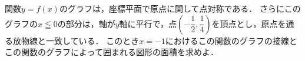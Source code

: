 \documentclass[../../main.tex]{subfiles}
\begin{document}
関数$y=f(x)$のグラフは，座標平面で原点に関して点対称である．
さらにこのグラフの$x \leqq 0$の部分は，軸が$y$軸に平行で，点$\displaystyle\left(-\dfrac{1}{2},\dfrac{1}{4}\right)$を頂点とし，原点を通る放物線と一致している．
このとき$x=-1$におけるこの関数のグラフの接線とこの関数のグラフによって囲まれる図形の面積を求めよ．
\end{document}
